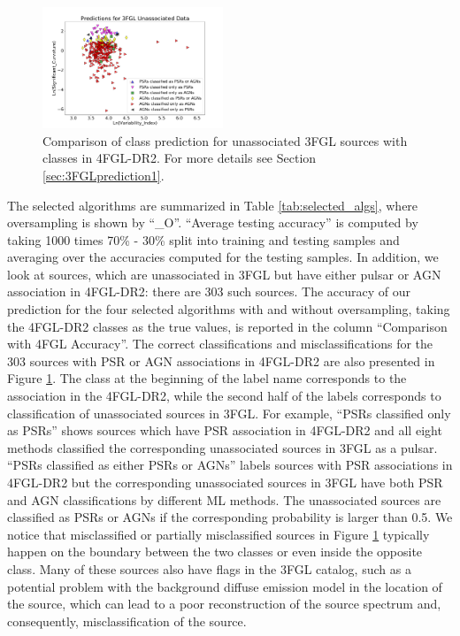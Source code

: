 \begin{figure}[h]
\centering
\includegraphics[width=0.48\textwidth]{plots/3FGL_unassoc_vs_4FGL-DR2_assoc.pdf}
\caption{Comparison of class prediction for unassociated 3FGL sources with classes in 4FGL-DR2. 
For more details see Section \ref{sec:3FGLprediction1}.}
\label{fig:3FGL_vs_4FGL_classes}
\end{figure}

The selected algorithms are summarized in Table \ref{tab:selected_algs}, where oversampling is shown by ``\_O''.
``Average testing accuracy'' is computed by taking 1000 times 70\% - 30\% split into training and testing samples and averaging over the 
accuracies computed for the testing samples.
In addition, we look at sources, which are unassociated in 3FGL but have either pulsar or AGN association in 4FGL-DR2: there are 303 such sources.
The accuracy of our prediction for the four selected algorithms with and without oversampling, taking the 4FGL-DR2 classes as the true values, is reported in the column ``Comparison with 4FGL Accuracy''.
The correct classifications and misclassifications for the 303 sources with PSR or AGN associations in 4FGL-DR2 are also presented in Figure \ref{fig:3FGL_vs_4FGL_classes}.
The class at the beginning of the label name corresponds to the association in the 4FGL-DR2, while the second half of the labels corresponds to classification of unassociated sources in 3FGL. For example, ``PSRs classified only as PSRs'' shows sources which have PSR association in 4FGL-DR2 and all eight methods classified the corresponding unassociated sources in 3FGL as a pulsar. ``PSRs classified as either PSRs or AGNs'' labels sources with PSR associations in 4FGL-DR2 but the corresponding unassociated sources in 3FGL have both PSR and AGN classifications by different ML methods.
The unassociated sources are classified as PSRs or AGNs if the corresponding probability is larger than 0.5.
We notice that misclassified or partially misclassified sources in Figure \ref{fig:3FGL_vs_4FGL_classes} typically happen on the boundary between the two classes or even inside the opposite class.
Many of these sources also have flags in the 3FGL catalog, such as a potential problem with the background diffuse emission model in the location of the source, which can lead to a poor reconstruction of the source spectrum and, consequently, misclassification of the source.


